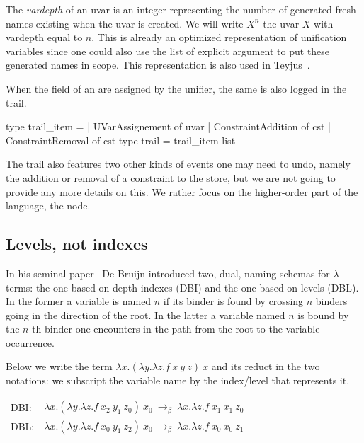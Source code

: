 \documentclass[a4paper, 11pt]{book}
\begin{document}
The \emph{vardepth} of an uvar is an integer representing the number of
 generated fresh names existing when the uvar is created. We will write
$X^n$ the uvar $X$ with vardepth equal to $n$. This is already an optimized
representation of unification variables since one could also use the list of explicit
argument to put these  generated names in scope. This representation is
also used in Teyjus~\cite{DBLP:journals/corr/abs-0911-5203}.

When the  field of an  are assigned by
the unifier, the same  is also logged in the trail.

\begin{ocamlcode}
type trail_item =
| UVarAssignement of uvar
| ConstraintAddition of cst
| ConstraintRemoval  of cst
type trail = trail_item list
\end{ocamlcode}

\noindent
The trail also features two other kinds of events one may need to undo, namely
the addition or removal of a constraint to the store, but we are not going to
provide any more details on this. We rather focus on the higher-order part
of the language, the  node.

\subsection{Levels, not indexes}\label{sec:dbl}

In his seminal paper~\cite{DEBRUIJN1994375} De Bruijn
introduced two, dual, naming schemas for $\lambda$-terms:
the one based on depth indexes (DBI) and the one based on levels (DBL).
In the former a variable is named $n$ if its binder is found by crossing $n$
binders going in the direction of the root. In the latter a variable named
$n$ is bound by the $n$-th binder one encounters in the path from the root
to the variable occurrence. 

Below we write the term $\lambda x.(\lambda y.\lambda z.f\ x\ y\ z)\ x$ and its
reduct in the two notations: we subscript the variable name by the index/level
that represents it.\\

\noindent
\begin{tabular}{ll}
DBI: & $\lambda x.(\lambda y.\lambda z.f\ x_2\ y_1\ z_0)\ x_0\ \to_\beta\ \lambda x.\lambda z.f\ x_1\ x_1\ z_0$\\
DBL: & $\lambda x.(\lambda y.\lambda z.f\ x_0\ y_1\ z_2)\ x_0\ \to_\beta\ \lambda x.\lambda z.f\ x_0\ x_0\ z_1$\\
\end{tabular}
~\\
\end{document}
